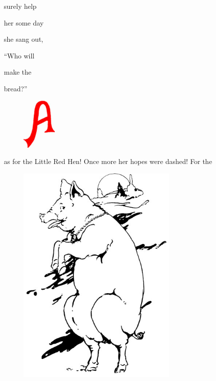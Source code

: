 \documentclass[letterpaper, 10pt, openany]{memoir}
\begin{document}
surely help

\vspace{\onelineskip}

her some day

\vspace{\onelineskip}

she sang out,

\vspace{\onelineskip}

``Who will

\vspace{\onelineskip}

make the

\vspace{\onelineskip}

bread?''

\newpage
\begin{figure}
	\includegraphics[width=0.15\textwidth]{image_005_1.jpg}
\end{figure}
as for the Little Red Hen! Once more her hopes were dashed! For the

\vspace{2\onelineskip}

\begin{figure}
	\includegraphics[width=0.7\textwidth]{image_031_2.jpg}
\end{figure}
\end{document}
